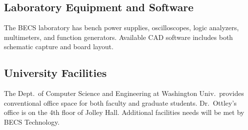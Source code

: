 \documentclass[11pt]{article}
\begin{document}
\subsection*{Laboratory Equipment and Software}

The BECS laboratory has bench power supplies, oscilloscopes, logic
analyzers, multimeters, and function generators.  Available CAD
software includes both schematic capture and board layout.

\subsection*{University Facilities}

The Dept.~of Computer Science and Engineering at
Washington Univ.~provides conventional office space
for both faculty and graduate students.
Dr.~Ottley's office is on the 4th floor of Jolley Hall.
Additional facilities needs will be met by BECS Technology.
\end{document}
